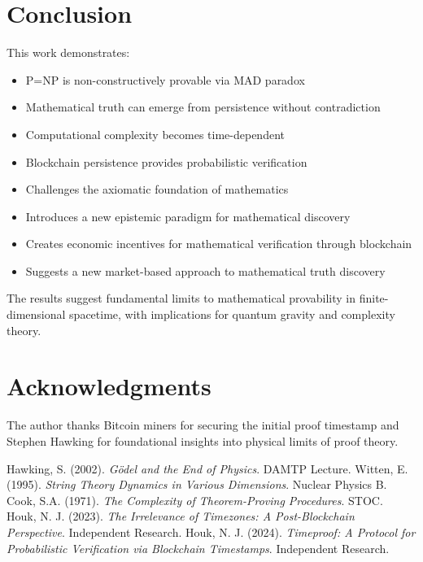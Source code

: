 \documentclass{article}
\begin{document}
\section{Conclusion}
This work demonstrates:
\begin{itemize}
    \item P=NP is non-constructively provable via MAD paradox
    \item Mathematical truth can emerge from persistence without contradiction
    \item Computational complexity becomes time-dependent
    \item Blockchain persistence provides probabilistic verification
    \item Challenges the axiomatic foundation of mathematics
    \item Introduces a new epistemic paradigm for mathematical discovery
    \item Creates economic incentives for mathematical verification through blockchain
    \item Suggests a new market-based approach to mathematical truth discovery
\end{itemize}

The results suggest fundamental limits to mathematical provability in finite-dimensional spacetime, with implications for quantum gravity and complexity theory.

\section*{Acknowledgments}
The author thanks Bitcoin miners for securing the initial proof timestamp and Stephen Hawking for foundational insights into physical limits of proof theory.

\begin{thebibliography}{9}
Hawking, S. (2002). \textit{Gödel and the End of Physics}. DAMTP Lecture.
Witten, E. (1995). \textit{String Theory Dynamics in Various Dimensions}. Nuclear Physics B.
Cook, S.A. (1971). \textit{The Complexity of Theorem-Proving Procedures}. STOC.
Houk, N. J. (2023). \textit{The Irrelevance of Timezones: A Post-Blockchain Perspective}. Independent Research.
Houk, N. J. (2024). \textit{Timeproof: A Protocol for Probabilistic Verification via Blockchain Timestamps}. Independent Research.
\end{thebibliography}
\end{document}
